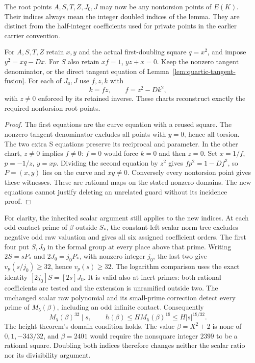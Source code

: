 The root points $A,S,T,Z,J_0,J$ may now be any nontorsion points of $E(K)$.
Their indices always mean the integer doubled indices of the lemma. They
are distinct from the half-integer coefficients used for private points
in the earlier carrier convention.

\begin{lemma}
\label{lem:quartic-general-root-charts}
For $A,S,T,Z$ retain $x,y$ and the actual first-doubling square $q=x^2$,
and impose $y^2=xq-Dx$. For $S$ also retain $xf=1$, $yz+x=0$.
Keep the nonzero tangent denominator, or the direct tangent
equation of Lemma~\ref{lem:quartic-tangent-fusion}. For each of $J_0,J$
use $f,z,k$ with
\[
 k=fz,\qquad f=z^2-Dk^2,
\]
with $z\ne0$ enforced by its retained inverse. These charts reconstruct exactly
the required nontorsion root points.
\end{lemma}
\begin{proof}
The first equations are the curve equation with a reused square. The
nonzero tangent denominator excludes all points with $y=0$, hence all
torsion. The two extra S equations preserve its reciprocal and parameter.
In the other chart, $z\ne0$ implies $f\ne0$: $f=0$ would force $k=0$
and then $z=0$. Set $x=1/f$, $p=-1/z$, $y=xp$. Dividing the second
equation by $z^2$ gives $fp^2=1-Df^2$, so $P=(x,y)$ lies on the curve
and $xy\ne0$. Conversely every nontorsion point gives these witnesses.
These are rational maps on the stated nonzero domains. The new equations
cannot justify deleting an unrelated guard without its incidence proof.
\end{proof}

For clarity, the inherited scalar argument still applies to the new
indices. At each odd contact prime of $\beta$ outside $S_*$, the
constant-left scalar norm tree excludes negative odd raw valuation and
gives all six assigned coefficient orders. The first four put $S,J_0$
in the formal group at every place above that prime. Writing
$2S=sP_*$ and $2J_0=j_0P_*$, with nonzero integer $j_0$, the last two
give $v_p(s/j_0)\ge32$, hence $v_p(s)\ge32$. The logarithm comparison
uses the exact identity $[2j_0]S=[2s]J_0$. It is valid also at inert
primes: both rational coefficients are tested and the extension is
unramified outside two. The unchanged scalar raw polynomial and its
small-prime correction detect every prime of $M_5(\beta)$, including
an odd infinite contact. Consequently
\[
 M_5(\beta)^{32}\mid s,\qquad
 h(\beta)\le H M_5(\beta)^{19}\le H|s|^{19/32}.
\]
The height theorem's domain condition holds. The value $\beta=X^2+2$
is none of $0,1,-343/32$, and $\beta=2401$ would require the nonsquare
integer $2399$ to be a rational square. Doubling both indices therefore
changes neither the scalar ratio nor its divisibility argument.

